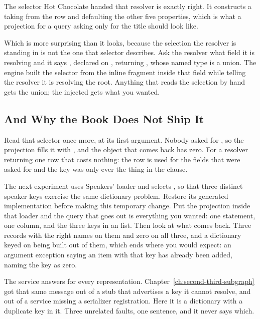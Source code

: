 %
The selector Hot Chocolate handed that resolver is exactly right. It constructs
a  taking  from the row and defaulting the other five
properties, which is what a projection for a query asking only for the title
should look like.

%
Which is more surprising than it looks, because the selection the resolver is
standing in is not the one that selector describes. Ask the resolver what field
it is resolving and it says , declared on ,
returning \code{[\_Entity]!}, whose named type is a union. The engine built the
selector from the inline fragment inside that field while telling the resolver
it is resolving the root. Anything that reads the selection by hand gets the
union; the injected  gets what you wanted.

\subsection{And Why the Book Does Not Ship It}

%
Read that selector once more, at its first argument. Nobody asked for ,
so the projection fills it with , and the object that comes
back has  zero. For a resolver returning one row that costs nothing:
the row is used for the fields that were asked for and the key was only ever the
thing in the  clause.

%
The next experiment uses Speakers' loader and selects , so that
three distinct speaker keys exercise the same dictionary problem. Restore
its generated implementation before making this temporary change. Put the
projection inside that loader and the query
that goes out is everything you wanted: one statement, one column, and the
three keys in an  list. Then look at what comes back. Three
 records with the right names on them and  zero on all
three, and a dictionary keyed on  being built out of them, which ends
where you would expect: an argument exception saying an item with that key has
already been added, naming the key as zero.

%
The service answers  for every representation.
Chapter~\ref{ch:second-third-subgraph} got that same message out of a stub that
advertises a key it cannot resolve, and out of a service missing a serializer
registration. Here it is a dictionary with a duplicate key in it. Three
unrelated faults, one sentence, and it never says which.

